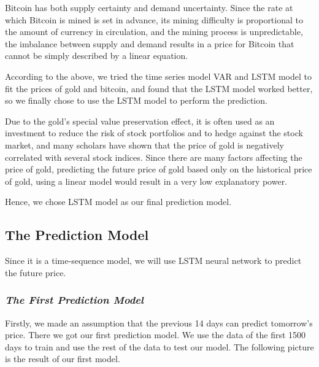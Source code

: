 \documentclass[12pt]{article}
\begin{document}
    Bitcoin has both supply certainty and demand uncertainty. Since the rate at which Bitcoin is mined is set in advance, its mining difficulty is proportional to the amount of currency in circulation, and the mining process is unpredictable, the imbalance between supply and demand results in a price for Bitcoin that cannot be simply described by a linear equation.
    
    According to the above, we tried the time series model VAR and LSTM model to fit the prices of gold and bitcoin, and found that the LSTM model worked better, so we finally chose to use the LSTM model to perform the prediction.
    
    Due to the gold's special value preservation effect, it is often used as an investment to reduce the risk of stock portfolios and to hedge against the stock market, and many scholars have shown that the price of gold is negatively correlated with several stock indices\cite{smith2001price}. Since there are many factors affecting the price of gold, predicting the future price of gold based only on the historical price of gold, using a linear model would result in a very low explanatory power.
    
    Hence, we chose LSTM model as our final prediction model.


    \subsection{The Prediction Model}

    Since it is a time-sequence model, we will use LSTM neural network\cite{lstm} to predict the future price.

    \subsubsection{\textit{The First Prediction Model}}
    Firstly, we made an assumption that the previous 14 days can predict tomorrow's price.
    There we got our first prediction model.
    We use the data of the first 1500 days to train and use the rest of the data to test our model.
    The following picture is the result of our first model.
\end{document}
